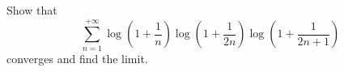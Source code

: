 \begin{problem}
    Show that
    \[
        \sum_{n=1}^{+\infty} \log\left(1+\frac{1}{n}\right) \log\left(1+\frac{1}{2n}\right) \log\left(1+\frac{1}{2n+1}\right)
    \]
    converges and find the limit.
\end{problem}
